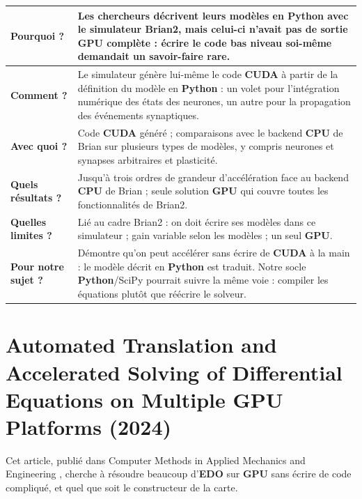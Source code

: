 \medskip
\begin{tabular}{|p{3.2cm}|p{11.2cm}|}
\hline
\textbf{Pourquoi ?} & Les chercheurs décrivent leurs modèles en \textbf{Python} avec le simulateur Brian2, mais celui-ci n'avait pas de sortie \textbf{GPU} complète : écrire le code bas niveau soi-même demandait un savoir-faire rare. \\ \hline
\textbf{Comment ?} & Le simulateur génère lui-même le code \textbf{CUDA} à partir de la définition du modèle en \textbf{Python} : un volet pour l'intégration numérique des états des neurones, un autre pour la propagation des événements synaptiques. \\ \hline
\textbf{Avec quoi ?} & Code \textbf{CUDA} généré ; comparaisons avec le backend \textbf{CPU} de Brian sur plusieurs types de modèles, y compris neurones et synapses arbitraires et plasticité. \\ \hline
\textbf{Quels résultats ?} & Jusqu'à trois ordres de grandeur d'accélération face au backend \textbf{CPU} de Brian ; seule solution \textbf{GPU} qui couvre toutes les fonctionnalités de Brian2. \\ \hline
\textbf{Quelles limites ?} & Lié au cadre Brian2 : on doit écrire ses modèles dans ce simulateur ; gain variable selon les modèles ; un seul \textbf{GPU}. \\ \hline
\textbf{Pour notre sujet ?} & Démontre qu'on peut accélérer sans écrire de \textbf{CUDA} à la main : le modèle décrit en \textbf{Python} est traduit. Notre socle \textbf{Python}/SciPy pourrait suivre la même voie : compiler les équations plutôt que réécrire le solveur. \\ \hline
\end{tabular}
\newpage
\section{Automated Translation and Accelerated Solving of Differential Equations on Multiple GPU Platforms (2024)}

Cet article, publié dans Computer Methods in Applied Mechanics and Engineering \cite{utkarsh2024}, cherche à résoudre beaucoup d'\textbf{EDO} sur \textbf{GPU} sans écrire de code compliqué, et quel que soit le constructeur de la carte.

